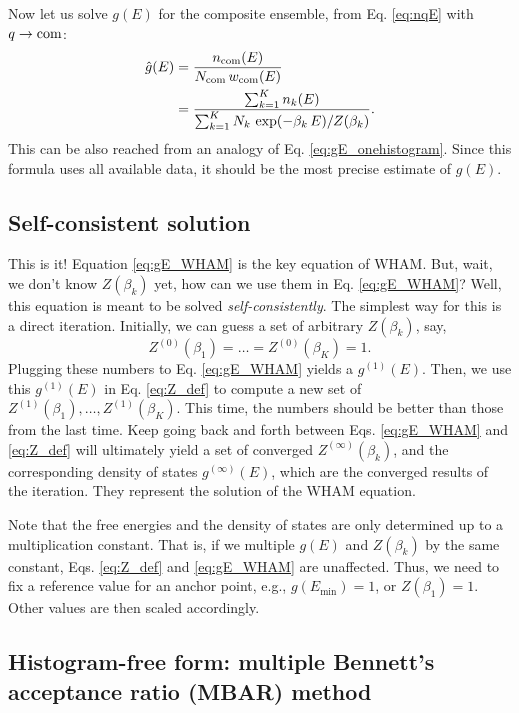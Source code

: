 \documentclass[aip,jcp,preprint,superscriptaddress]{revtex4-1}
\begin{document}
Now let us solve $g(E)$
for the composite ensemble,
from Eq. \eqref{eq:nqE}
with $q \rightarrow \mathrm{com}$:
%
\begin{align}
\hat g(E)
&=
\frac{ n_{\mathrm{com}}(E) }
{ N_{\mathrm{com}} \, w_{\mathrm{com}}(E) }
\notag \\
&=
\frac{ \sum_{k = 1}^K n_k(E) }
{ \sum_{k = 1}^K N_k \, \exp( -\beta_k \, E ) / Z(\beta_k) }.
\label{eq:gE_WHAM}
\end{align}
%
This can be also reached from an analogy
of Eq. \eqref{eq:gE_onehistogram}.
%
Since this formula uses all available data,
it should be the most precise estimate of $g(E)$.




\subsection{\label{sec:WHAM_selfconsistent}
Self-consistent solution}



This is it!
%
Equation \eqref{eq:gE_WHAM} is the key equation of WHAM.
%
But, wait, we don't know $Z(\beta_k)$ yet,
how can we use them in Eq. \eqref{eq:gE_WHAM}?
%
Well, this equation is meant to be solved
\emph{self-consistently}.
%
The simplest way for this is a direct iteration.
%
Initially,
we can guess a set of arbitrary
$Z(\beta_k)$,
say,
\[
  Z^{(0)}(\beta_1) = \dots = Z^{(0)}(\beta_K) = 1.
\]
%
Plugging these numbers to Eq. \eqref{eq:gE_WHAM}
yields a $g^{(1)}(E)$.
%
Then, we use this $g^{(1)}(E)$ in Eq. \eqref{eq:Z_def}
to compute a new set of
$Z^{(1)}(\beta_1), \dots, Z^{(1)}(\beta_K)$.
%
This time, the numbers should be better
than those from the last time.
%
Keep going back and forth
between Eqs. \eqref{eq:gE_WHAM} and \eqref{eq:Z_def}
will ultimately yield a set of converged
$Z^{(\infty)}(\beta_k)$,
and the corresponding density of states
$g^{(\infty)}(E)$,
which are the converged results of the iteration.
%
They represent the solution of the WHAM equation.



Note that the free energies and the density of states
are only determined up to a multiplication constant.
%
That is,
if we multiple $g(E)$ and $Z(\beta_k)$
by the same constant,
Eqs. \eqref{eq:Z_def} and \eqref{eq:gE_WHAM}
are unaffected.
%
Thus, we need to
fix a reference value for an anchor point,
e.g.,
$g(E_{\min}) = 1$,
or
$Z(\beta_1) = 1$.
%
Other values are then scaled accordingly.



\subsection{\label{sec:MBAR}
Histogram-free form: multiple Bennett's acceptance ratio (MBAR) method}
\end{document}
